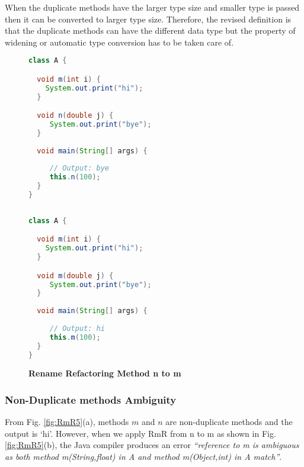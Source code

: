 When the duplicate methods have the larger type size and smaller type is passed then it can be converted to larger type size. Therefore, the revised definition is that the duplicate methods can have the different data type but the property of widening or automatic type conversion has to be taken care of.

\begin{figure}[th]
\centering
\begin{minipage}[t]{0.47\linewidth}
\begin{lstlisting}[language=java, basicstyle=\scriptsize\ttfamily,frame=single]
class A {

  void m(int i) {	
    System.out.print("hi");
  }

  void n(double j) {	
     System.out.print("bye");
  }	
  
  void main(String[] args) {
	
     // Output: bye
     this.n(100); 
  }
}
 
\end{lstlisting}
\end{minipage}
\hfill
\begin{minipage}[t]{0.47\linewidth}
\begin{lstlisting}[language=java, basicstyle=\scriptsize\ttfamily,frame=single]
class A {

  void m(int i) {	
    System.out.print("hi");
  }

  void m(double j) {	
     System.out.print("bye");
  }	
  
  void main(String[] args) {
	
     // Output: hi
     this.m(100); 
  }
}

\end{lstlisting}
\end{minipage}
\caption{\textbf{Rename Refactoring Method n to m}}
\label{fig:RmR4}
\end{figure}

\subsubsection {Non-Duplicate methods Ambiguity} 
From Fig. \ref{fig:RmR5}(a), methods $m$ and $n$ are non-duplicate methods and the output is `hi'. However, when we apply RmR from n to m as shown in Fig. \ref{fig:RmR5}(b), the Java compiler produces an error \textsl{``reference to m is ambiguous as both method m(String,float) in A and method m(Object,int) in A match''}. 


